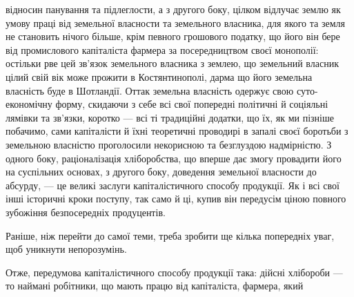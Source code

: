 відносин панування та підлеглости, а з другого боку, цілком відлучає землю
як умову праці від земельної власности та земельного власника, для якого та
земля не становить нічого більше, крім певного грошового податку, що його
він бере від промислового капіталіста фармера за посередництвом своєї монополії:
остільки рве цей зв’язок земельного власника з землею, що земельний власник
цілий свій вік може прожити в Костянтинополі, дарма що його земельна власність
буде в Шотландії. Оттак земельна власність одержує свою суто-економічну
форму, скидаючи з себе всі свої попередні політичні й соціяльні лямівки та
зв’язки, коротко — всі ті традиційні додатки, що їх, як ми пізніше побачимо, сами
капіталісти й їхні теоретичні проводирі в запалі своєї боротьби з земельною
власністю проголосили некорисною та безглуздою надмірністю. З одного боку,
раціоналізація хліборобства, що вперше дає змогу провадити його на суспільних
основах, з другого боку, доведення земельної власности до абсурду, — це великі
заслуги капіталістичного способу продукції. Як і всі свої інші історичні кроки
поступу, так само й ці, купив він передусім ціною повного зубожіння безпосередніх
продуцентів.

Раніше, ніж перейти до самої теми, треба зробити ще кілька попередніх
уваг, щоб уникнути непорозумінь.

Отже, передумова капіталістичного способу продукції така: дійсні хлібороби
— то наймані робітники, що мають працю від капіталіста, фармера, який
\parbreak{}  %

